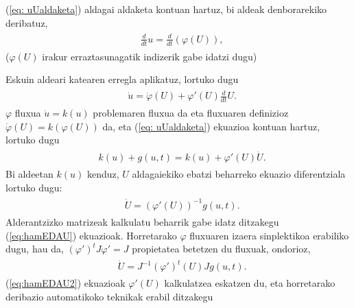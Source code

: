 (\ref{eq: uUaldaketa}) aldagai aldaketa kontuan hartuz, bi aldeak denborarekiko deribatuz, 
\begin{align}
\begin{split}
&\frac{d}{dt}u = \frac{d}{dt}\left(\varphi(U)\right),
\end{split}
\end{align}
($\varphi(U)$ irakur erraztasunagatik indizerik gabe idatzi dugu)

 Eskuin aldeari katearen erregla aplikatuz, lortuko dugu
\begin{align}
\begin{split}
&\dot{u} = \dot{\varphi}(U) + \varphi'(U) 
\frac{d}{dt}U.
\end{split}
\end{align}
$\varphi$ fluxua $\dot{u} = k(u)$ problemaren fluxua da eta fluxuaren definizioz $\dot{\varphi}(U) = k(\varphi(U))$ da, eta (\ref{eq: uUaldaketa}) ekuazioa kontuan hartuz, lortuko dugu
\begin{align}
\begin{split}
&k(u) + g(u,t) = k(u) + \varphi'(U) \dot{U}.
\end{split}
\end{align}
Bi aldeetan $k(u)$  kenduz, $U$ aldagaiekiko ebatzi beharreko ekuazio diferentziala lortuko dugu:
\begin{align}
\begin{split}
\label{eq:hamEDAU}
&\dot{U} = \left(\varphi'(U)\right)^{-1} g(u,t).
\end{split}
\end{align}
Alderantzizko matrizeak kalkulatu beharrik gabe idatz ditzakegu (\ref{eq:hamEDAU}) ekuazioak. Horretarako $\varphi$ fluxuaren izaera sinplektikoa erabiliko dugu, hau da, $(\varphi')^tJ\varphi'= J$ propietatea betetzen du fluxuak, ondorioz,
%
\begin{align}
\begin{split}
\label{eq:hamEDAU2}
&\dot{U} = J^{-1}(\varphi')^{t}(U)J g(u,t).
\end{split}
\end{align}
(\ref{eq:hamEDAU2}) ekuazioak $\varphi'(U)$ kalkulatzea eskatzen du, eta horretarako deribazio automatikoko teknikak erabil ditzakegu


